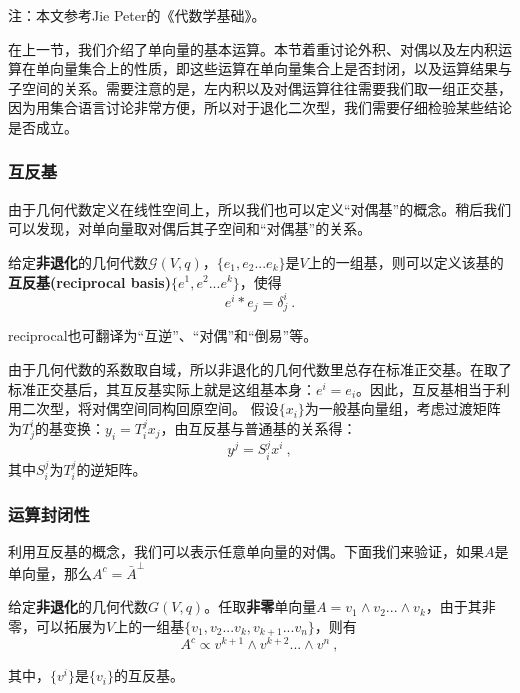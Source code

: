 

\begin{issues}
\issueTODO
\end{issues}
注：本文参考Jie Peter的《代数学基础》。

在上一节，我们介绍了单向量的基本运算。本节着重讨论外积、对偶以及左内积运算在单向量集合上的性质，即这些运算在单向量集合上是否封闭，以及运算结果与子空间的关系。需要注意的是，左内积以及对偶运算往往需要我们取一组正交基，因为用集合语言讨论非常方便，所以对于退化二次型，我们需要仔细检验某些结论是否成立。
\subsubsection{互反基}
由于几何代数定义在线性空间上，所以我们也可以定义“对偶基”的概念。稍后我们可以发现，对单向量取对偶后其子空间和“对偶基”的关系。

\begin{definition}{}
给定\textbf{非退化}的几何代数$\mathcal G(V,q)$，$\{e_1,e_2...e_k\}$是$V$上的一组基，则可以定义该基的\textbf{互反基(reciprocal basis)}$\{e^1,e^2...e^k\}$，使得
\begin{equation}
e^i*e_j=\delta^i_j~.
\end{equation}
\end{definition}
reciprocal也可翻译为“互逆”、“对偶”和“倒易”等。

由于几何代数的系数取自域，所以非退化的几何代数里总存在标准正交基。在取了标准正交基后，其互反基实际上就是这组基本身：$e^i=e_i$。因此，互反基相当于利用二次型，将对偶空间同构回原空间。
假设$\{x_i\}$为一般基向量组，考虑过渡矩阵为$T^i_j$的基变换：$y_i=T^j_ix_j$，由互反基与普通基的关系得：
\begin{equation}
y^j=S^j_ix^i~,
\end{equation}
其中$S^j_i$为$T^j_i$的逆矩阵。

\subsubsection{运算封闭性}
利用互反基的概念，我们可以表示任意单向量的对偶。下面我们来验证，如果$A$是单向量，那么$A^c=\bar A^{\perp}$
\begin{theorem}{}
给定\textbf{非退化}的几何代数$G(V,q)$。任取\textbf{非零}单向量$A=v_1\wedge v_2...\wedge v_k$，由于其非零，可以拓展为$V$上的一组基$\{v_1,v_2...v_k,v_{k+1}...v_n\}$，则有
\begin{equation}
A^c\propto v^{k+1}\wedge v^{k+2}...\wedge v^n~,
\end{equation}
\end{theorem}
其中，$\{v^i\}$是$\{v_i\}$的互反基。

